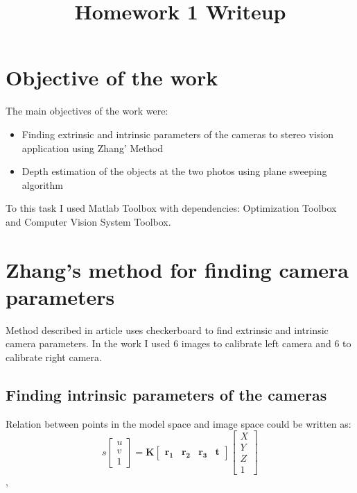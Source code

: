 \pagestyle{fancy}
\fancyhf{}
\rfoot{\thepage}

\date{}

\title{\vspace{-1cm}Homework 1 Writeup}



\maketitle
\vspace{-3cm}
\thispagestyle{fancy}

\section*{Objective of the work}

The main objectives of the work were:
\begin{itemize}
    \item Finding extrinsic and intrinsic parameters of the cameras to stereo vision application using Zhang' Method \cite{zhang2000flexible}
    \item Depth estimation of the objects at the two photos using plane sweeping algorithm
\end{itemize}

To this task I used Matlab Toolbox with dependencies: Optimization Toolbox and Computer Vision System Toolbox.

\section*{Zhang's method for finding camera parameters}

Method described in article \cite{zhang2000flexible} uses checkerboard to find extrinsic and intrinsic camera parameters. In the work I used 6 images to calibrate left camera and 6 to calibrate right camera.

\subsection*{Finding intrinsic parameters of the cameras}
Relation between points in the model space and image space could be written as:
$$s\begin{bmatrix}u \\ v \\ 1\end{bmatrix} =
\mathbf{K}\begin{bmatrix}\mathbf{r_1} & \mathbf{r_2} & \mathbf{r_3} & \mathbf{t} \end{bmatrix}\begin{bmatrix}X \\ Y \\ Z \\ 1\end{bmatrix}$$, 

